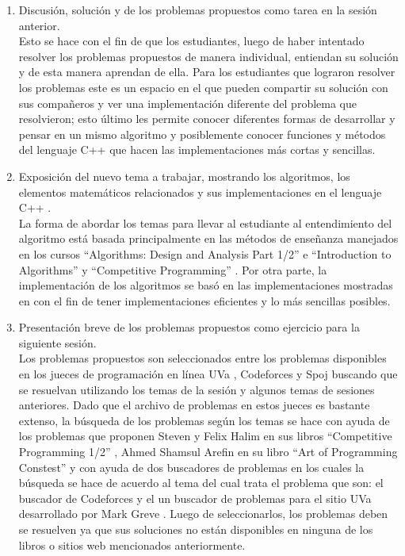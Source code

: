 \documentclass[conference]{IEEEtran}
\begin{document}
	\begin{enumerate}
		\item Discusión, solución y de los problemas propuestos como tarea en la sesión anterior.\\Esto se hace con el fin de que los estudiantes, luego de haber intentado resolver los problemas propuestos de manera individual, entiendan su solución y de esta manera aprendan de ella. Para los estudiantes que lograron resolver los problemas este es un espacio en el que pueden compartir su solución con sus compañeros y ver una implementación diferente del problema que resolvieron; esto último les permite conocer diferentes formas de desarrollar y pensar en un mismo algoritmo y posiblemente conocer funciones y métodos del lenguaje C++ que hacen las implementaciones más cortas y sencillas.
		\item Exposición del nuevo tema a trabajar, mostrando los algoritmos, los elementos matemáticos relacionados y sus implementaciones en el lenguaje C++ \cite{C++}.\\La forma de abordar los temas para llevar al estudiante al entendimiento del algoritmo está basada principalmente en las métodos de enseñanza manejados en los cursos ``Algorithms: Design and Analysis Part 1/2'' \cite{Coursera1, Coursera2} e ``Introduction to Algorithms'' \cite{CourseMIT} y ``Competitive Programming'' \cite{CourseNUS}. Por otra parte, la implementación de los algoritmos se basó en las implementaciones mostradas en \cite{Halim, Halim2, ArtOfProgramming} con el fin de tener implementaciones eficientes y lo más sencillas posibles.
		\item Presentación breve de los problemas propuestos como ejercicio para la siguiente sesión.\\Los problemas propuestos son seleccionados entre los problemas disponibles en los jueces de programación en línea UVa \cite{UVa}, Codeforces \cite{Codeforces} y Spoj\cite{Spoj} buscando que se resuelvan utilizando los temas de la sesión y algunos temas de sesiones anteriores. Dado que el archivo de problemas en estos jueces es bastante extenso, la búsqueda de los problemas según los temas se hace con ayuda de los problemas que proponen Steven y Felix Halim en sus libros ``Competitive Programming 1/2'' \cite{Halim, Halim2}, Ahmed Shamsul Arefin en su libro ``Art of Programming Constest''\cite{ArtOfProgramming} y con ayuda de dos buscadores de problemas en los cuales la búsqueda se hace de acuerdo al tema del cual trata el problema que son: el buscador de Codeforces y el un buscador de problemas para el sitio UVa desarrollado por Mark Greve \cite{UVAToolkit}. Luego de seleccionarlos, los problemas deben se resuelven ya que sus soluciones no están disponibles en ninguna de los libros o sitios web mencionados anteriormente.
	\end{enumerate}
\end{document}
